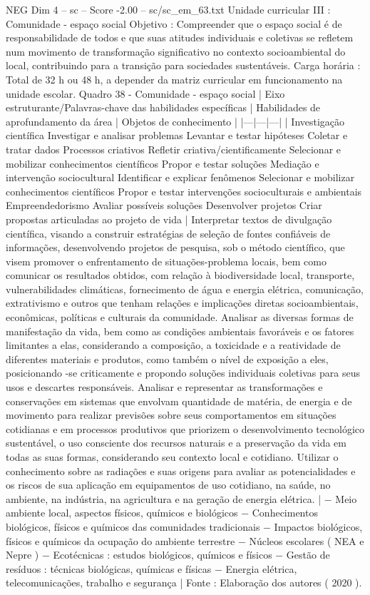 \begin{textsample}{NEG Dim 4 – sc – Score -2.00 – sc/sc\_em\_63.txt}
Unidade curricular III : Comunidade - espaço social Objetivo : Compreender que o espaço social é de responsabilidade de todos e que suas atitudes individuais e coletivas se refletem num movimento de transformação significativo no contexto socioambiental do local, contribuindo para a transição para sociedades sustentáveis.
Carga horária : Total de 32 h ou 48 h, a depender da matriz curricular em funcionamento na unidade escolar.
Quadro 38 - Comunidade - espaço social | Eixo estruturante/Palavras-chave das habilidades específicas | Habilidades de aprofundamento da área | Objetos de conhecimento | |---|---|---| | Investigação científica Investigar e analisar problemas Levantar e testar hipóteses Coletar e tratar dados Processos criativos Refletir criativa/cientificamente Selecionar e mobilizar conhecimentos científicos Propor e testar soluções Mediação e intervenção sociocultural Identificar e explicar fenômenos Selecionar e mobilizar conhecimentos científicos Propor e testar intervenções socioculturais e ambientais Empreendedorismo Avaliar possíveis soluções Desenvolver projetos Criar propostas articuladas ao projeto de vida | Interpretar textos de divulgação científica, visando a construir estratégias de seleção de fontes confiáveis de informações, desenvolvendo projetos de pesquisa, sob o método científico, que visem promover o enfrentamento de situações-problema locais, bem como comunicar os resultados obtidos, com relação à biodiversidade local, transporte, vulnerabilidades climáticas, fornecimento de água e energia elétrica, comunicação, extrativismo e outros que tenham relações e implicações diretas socioambientais, econômicas, políticas e culturais da comunidade.
Analisar as diversas formas de manifestação da vida, bem como as condições ambientais favoráveis e os fatores limitantes a elas, considerando a composição, a toxicidade e a reatividade de diferentes materiais e produtos, como também o nível de exposição a eles, posicionando -se criticamente e propondo soluções individuais coletivas para seus usos e descartes responsáveis.
Analisar e representar as transformações e conservações em sistemas que envolvam quantidade de matéria, de energia e de movimento para realizar previsões sobre seus comportamentos em situações cotidianas e em processos produtivos que priorizem o desenvolvimento tecnológico sustentável, o uso consciente dos recursos naturais e a preservação da vida em todas as suas formas, considerando seu contexto local e cotidiano.
Utilizar o conhecimento sobre as radiações e suas origens para avaliar as potencialidades e os riscos de sua aplicação em equipamentos de uso cotidiano, na saúde, no ambiente, na indústria, na agricultura e na geração de energia elétrica. | − Meio ambiente local, aspectos físicos, químicos e biológicos − Conhecimentos biológicos, físicos e químicos das comunidades tradicionais − Impactos biológicos, físicos e químicos da ocupação do ambiente terrestre − Núcleos escolares ( NEA e Nepre ) − Ecotécnicas : estudos biológicos, químicos e físicos − Gestão de resíduos : técnicas biológicas, químicas e físicas − Energia elétrica, telecomunicações, trabalho e segurança | Fonte : Elaboração dos autores ( 2020 ).

\end{textsample}
